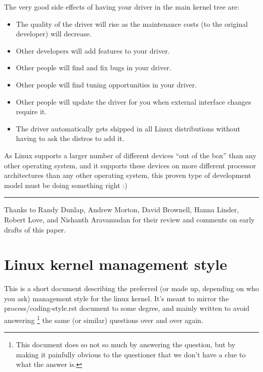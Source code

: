 \documentclass[a4paper,8pt,english]{sphinxmanual}
\begin{document}
The very good side effects of having your driver in the main kernel tree
are:
\begin{itemize}
\item {} 
The quality of the driver will rise as the maintenance costs (to the
original developer) will decrease.

\item {} 
Other developers will add features to your driver.

\item {} 
Other people will find and fix bugs in your driver.

\item {} 
Other people will find tuning opportunities in your driver.

\item {} 
Other people will update the driver for you when external interface
changes require it.

\item {} 
The driver automatically gets shipped in all Linux distributions
without having to ask the distros to add it.

\end{itemize}

As Linux supports a larger number of different devices ``out of the box''
than any other operating system, and it supports these devices on more
different processor architectures than any other operating system, this
proven type of development model must be doing something right :)


\bigskip\hrule{}\bigskip


Thanks to Randy Dunlap, Andrew Morton, David Brownell, Hanna Linder,
Robert Love, and Nishanth Aravamudan for their review and comments on
early drafts of this paper.


\chapter{Linux kernel management style}
\label{process/management-style:managementstyle}\label{process/management-style::doc}\label{process/management-style:linux-kernel-management-style}
This is a short document describing the preferred (or made up, depending
on who you ask) management style for the linux kernel.  It's meant to
mirror the process/coding-style.rst document to some degree, and mainly written to
avoid answering \footnote[1]{
This document does so not so much by answering the question, but by
making it painfully obvious to the questioner that we don't have a clue
to what the answer is.
}  the same (or similar) questions over and over again.
\end{document}
